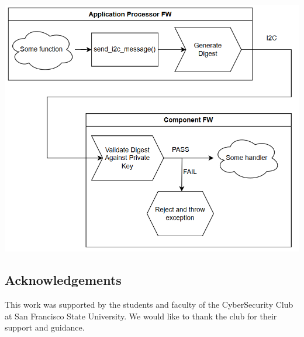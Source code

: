\documentclass{prace}
\begin{document}
\includegraphics[scale=0.5]{./diagramSR5.png}

%



\subsection*{Acknowledgements}
This work was supported by the students and faculty of the CyberSecurity Club at San Francisco State University. We would like to thank the club for their support and guidance.

\end{document}
